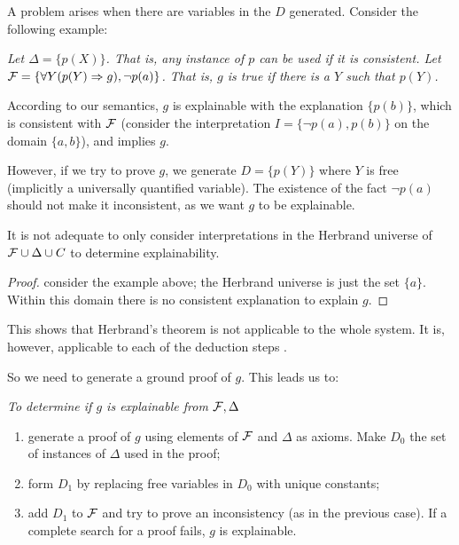 A problem arises
when there are variables in the $D$ generated.
 Consider the following example:
\begin{example}\em
Let $ \Delta = \{p(X)\}$. That is, any instance of $p$ can be used if it is
consistent.
Let ${\cal F} = \{ \forall Y (p(Y) \Rightarrow g), \neg p(a)\}$. That is, $g$ is
true if there is a $Y$ such that $p(Y)$.

According to our semantics,
$g$ is explainable with the explanation $\{p(b)\}$,
which is consistent with ${\cal F}$ (consider the interpretation $I=\{\neg p(a),p(b)\}$
on the domain $\{a,b\}$), and implies $g$.

However,
if we try to prove $g$, we generate $D=\{p(Y)\}$ where $Y$ is free
(implicitly a universally quantified variable).
The existence of the fact $\neg p(a)$ should not make it
inconsistent, as we want $g$ to be explainable.
\end{example}
\begin{theorem}
It is not adequate to only consider interpretations in the
Herbrand universe of ${\cal F}\cup \Delta \cup C$ to determine explainability.
\end{theorem}
\begin{proof}
consider the example above; the Herbrand universe is just
the set $\{a\}$. Within this domain there is no consistent 
explanation to explain $g$.
\end{proof}

This shows that Herbrand's theorem is not applicable to the whole system.
It is, however, applicable to each of the deduction steps \cite{chang}.

So we need to generate a ground proof of $g$. This leads us to:

\begin{algorithm} \em \label{det-alg}
To determine if $g$ is explainable from ${\cal F},\Delta$
\begin{enumerate}
\item generate a proof of $g$ using elements of ${\cal F}$ and $ \Delta$ as axioms.
Make $D_0$ the set of instances of $ \Delta$ used in the proof;
\item form $D_1$ by replacing free variables in $D_0$ with unique constants;
\item add $D_1$ to ${\cal F}$ and try to prove an inconsistency (as in the
previous case). If a
complete search for a proof fails, $g$ is explainable.
\end{enumerate}
\end{algorithm}

